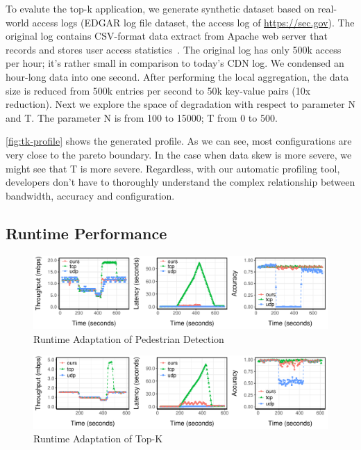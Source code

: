  To evalute the top-k application, we generate synthetic dataset
based on real-world access logs (EDGAR log file dataset, the access log of
\url{https://sec.gov}). The original log contains CSV-format data extract from
Apache web server that records and stores user access
statistics~\cite{edgarlog}. The original log has only 500k access per hour; it's
rather small in comparison to today's CDN log. We condensed an hour-long data
into one second. After performing the local aggregation, the data size is
reduced from 500k entries per second to 50k key-value pairs (10x reduction).
Next we explore the space of degradation with respect to parameter N and T.  The
parameter N is from 100 to 15000; T from 0 to 500.

\autoref{fig:tk-profile} shows the generated profile. As we can see, most
configurations are very close to the pareto boundary. In the case when data skew
is more severe, we might see that T is more severe. Regardless, with our
automatic profiling tool, developers don't have to thoroughly understand the
complex relationship between bandwidth, accuracy and configuration.

\subsection{Runtime Performance}
\label{sec:runtime-performance}

\begin{figure}
  \centering
  \includegraphics[width=\textwidth]{figures/ped-runtime-horizontal.pdf}
  \caption{Runtime Adaptation of Pedestrian Detection}
  \label{fig:ped-runtime}
\end{figure}

\begin{figure}
  \centering
  \includegraphics[width=\textwidth]{figures/cdn-runtime-horizontal.pdf}
  \caption{Runtime Adaptation of Top-K}
  \label{fig:ped-runtime}
\end{figure}


